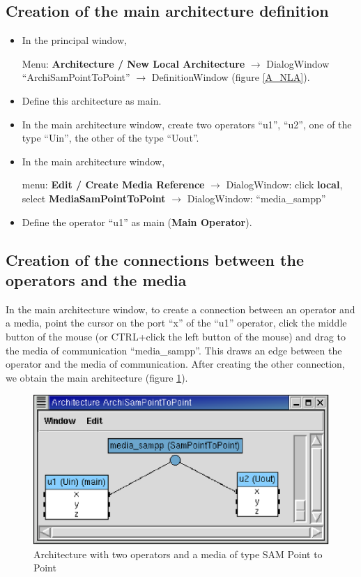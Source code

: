 \documentclass[a4paper,twoside]{report}
\begin{document}
\subsection{Creation of the main architecture definition}
\begin{itemize}
\item In the principal window, 

Menu: \textbf{Architecture / New Local Architecture} $\rightarrow$
DialogWindow ``ArchiSamPointToPoint'' $\rightarrow$ DefinitionWindow (figure
\ref{A_NLA}).

\item Define this architecture as main.

\item In the main architecture window, create two operators ``u1'', ``u2'', one of the type ``Uin'', the other of
the type ``Uout''.

\item In the main architecture window,

menu: \textbf{Edit / Create Media Reference} $\rightarrow$ DialogWindow: click
\textbf{local}, select \textbf{MediaSamPointToPoint} $\rightarrow$ DialogWindow:
``media\_sampp''

\item Define the operator ``u1'' as main (\textbf{Main Operator}).
\end{itemize}

\subsection{Creation of the connections between the operators and the media}
In the main architecture window, to create a connection between an operator and
a media, point the cursor on the port ``x'' of the ``u1'' operator, click the
middle button of the mouse (or CTRL+click the left button of the mouse) and
drag to the media of communication ``media\_sampp''. This draws an edge between
the operator and the media of communication. After creating the other
connection, we obtain the main architecture (figure \ref{archi1_2}).

\begin{figure}[ht]
  \begin{center} 
        \includegraphics[width=0.527\linewidth]{architecture_ex1_2u_SPP.eps} 
  \end{center}
  \caption{Architecture with two operators and a media of type SAM Point to
Point} 
  \label{archi1_2}
\end{figure}
\end{document}
